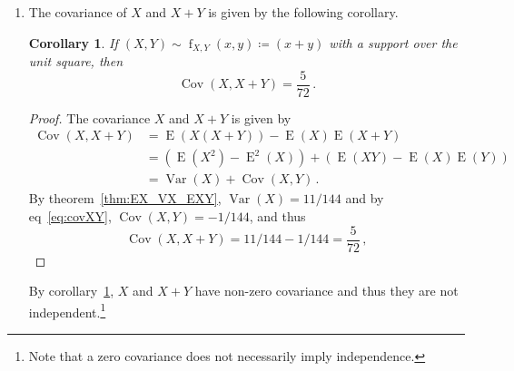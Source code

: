 \documentclass[10pt]{fphw}
\newtheorem{corollary}{Corollary}
\newcommand{\var}{\operatorname{Var}}
\newcommand{\expect}{\operatorname{E}}
\newcommand{\corr}{\operatorname{Corr}}
\newcommand{\cov}{\operatorname{Cov}}
\begin{document}
\begin{enumerate}
\begin{proof}
	Without proof we claim the expectation of $Y$ is the same as $X$ by applying the same proof in part (a) for $Y$ instead of $X$.
	We also found $\expect(X Y)$ in part (a).
	Plugging in these solutions to the above equation yields
	\begin{equation}
	\label{eq:covXY}
		\cov(X,Y) = \frac{1}{3} - \frac{7}{12} \frac{7}{12} = -\frac{1}{144}
	\end{equation}	
	and thus the correlation is
	\begin{equation}
		\corr(X,Y) = \frac{-\frac{1}{144}}{\sqrt{5/12}\sqrt{5/12}} = -\frac{1}{60}\,.
	\end{equation}
    \end{proof}

	The random variables $X$ and $Y$ are dependent since they have a non-zero correlation.\footnote{We also knew they are dependent by the fact that their joint PDF cannot be factored into a product of two terms, one involving only $x$ and the other only $y$.}
	
	\item The covariance of $X$ and $X+Y$ is given by the following corollary.    
    \begin{corollary}
    \label{cor:covX_X_plus_Y}	
    If $(X,Y) \sim \operatorname{f}_{X,Y}(x,y) \coloneqq (x+y)$ with a support over the unit square, then
    \begin{equation}
        \cov(X,X+Y) = \frac{5}{72}\,.
    \end{equation}
    \end{corollary}
    \begin{proof}
    The covariance $X$ and $X+Y$ is given by
	\begin{equation}
	\begin{split}
		\cov(X,X+Y)
			&= \expect(X (X+Y)) - \expect(X)\expect(X+Y)\\
			&= \left(\expect(X^2) - \expect^2(X)\right) + \left(\expect(X Y) - \expect(X)\expect(Y)\right)\\
			&= \var(X) + \cov(X,Y)\,.
	\end{split}
	\end{equation}
	By theorem~\ref{thm:EX_VX_EXY}, $\var(X) = 11/144$ and by eq~\ref{eq:covXY}, $\cov(X,Y) = -1/144$, and thus
	\begin{equation}
		\cov(X,X+Y) = 11/144 - 1/144 = \frac{5}{72}\,,
	\end{equation}
\end{proof}

By corollary~\ref{cor:covX_X_plus_Y}, $X$ and $X+Y$ have non-zero covariance and thus they are not independent.\footnote{Note that a zero covariance does not necessarily imply independence.}

\end{enumerate}
\end{document}
